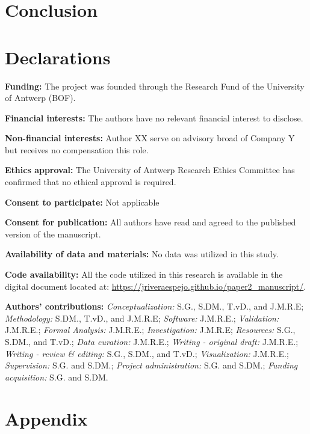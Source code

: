 \documentclass[
  authoryear,
  preprint,
  1p]{elsarticle}
\begin{document}
\section{Conclusion}\label{sec-conclusion}

\newpage{}

\section*{Declarations}\label{declarations}

\textbf{Funding:} The project was founded through the Research Fund of
the University of Antwerp (BOF).

\textbf{Financial interests:} The authors have no relevant financial
interest to disclose.

\textbf{Non-financial interests:} Author XX serve on advisory broad of
Company Y but receives no compensation this role.

\textbf{Ethics approval:} The University of Antwerp Research Ethics
Committee has confirmed that no ethical approval is required.

\textbf{Consent to participate:} Not applicable

\textbf{Consent for publication:} All authors have read and agreed to
the published version of the manuscript.

\textbf{Availability of data and materials:} No data was utilized in
this study.

\textbf{Code availability:} All the code utilized in this research is
available in the digital document located at:
\url{https://jriveraespejo.github.io/paper2_manuscript/}.

\textbf{Authors' contributions:} \emph{Conceptualization:} S.G., S.DM.,
T.vD., and J.M.R.E; \emph{Methodology:} S.DM., T.vD., and J.M.R.E;
\emph{Software:} J.M.R.E.; \emph{Validation:} J.M.R.E.; \emph{Formal
Analysis:} J.M.R.E.; \emph{Investigation:} J.M.R.E; \emph{Resources:}
S.G., S.DM., and T.vD.; \emph{Data curation:} J.M.R.E.; \emph{Writing -
original draft:} J.M.R.E.; \emph{Writing - review \& editing:} S.G.,
S.DM., and T.vD.; \emph{Visualization:} J.M.R.E.; \emph{Supervision:}
S.G. and S.DM.; \emph{Project administration:} S.G. and S.DM.;
\emph{Funding acquisition:} S.G. and S.DM.

\newpage{}

\section{Appendix}\label{sec-appendix}
\end{document}
